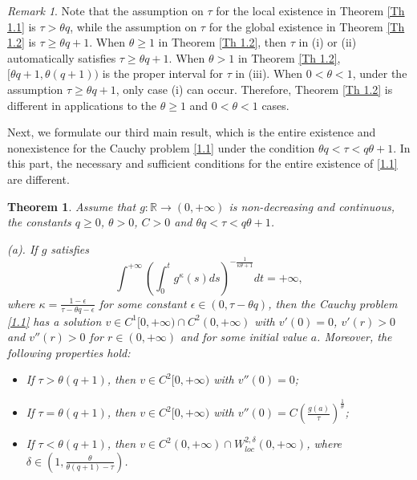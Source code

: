 \documentclass[a4paper,11pt]{amsart}
\theoremstyle{plain}
\newtheorem{Theorem}{Theorem}[section]
\theoremstyle{remark}
\newtheorem{remark}{Remark}
\numberwithin{equation}{section}
\numberwithin{figure}{section}
\numberwithin{remark}{section}
\begin{document}
\begin{sloppypar}
\begin{remark}\label{Remark 1.1}
Note that the assumption on $\tau$ for the local existence in Theorem \ref{Th 1.1} is $\tau > \theta q$, while the assumption on $\tau$ for the global existence in Theorem \ref{Th 1.2} is $\tau \ge \theta q+1$. When $\theta \ge 1$ in Theorem \ref{Th 1.2}, then $\tau$ in (i) or (ii) automatically satisfies $\tau \ge \theta q+1$. When $\theta > 1$ in Theorem \ref{Th 1.2}, $[\theta q+1, \theta (q+1))$ is the proper interval for $\tau$ in (iii). When $0<\theta<1$, under the assumption $\tau \ge \theta q+1$, only case (i) can occur. Therefore, Theorem \ref{Th 1.2}  is different in applications to the $\theta \ge 1$ and $0<\theta <1$ cases.
\end{remark}

Next, we formulate our third main result, which is the entire existence and nonexistence for the Cauchy problem \eqref{1.1} under the condition $\theta q< \tau < q\theta+1$. In this part, the necessary and  sufficient conditions for the entire existence of \eqref{1.1} are different.
\begin{Theorem}\label{Th 1.3}
Assume that $g: \mathbb{R} \to (0,+\infty)$ is  non-decreasing and continuous, the constants $q\ge 0$, $\theta> 0$, $C>0$ and $\theta q  < \tau <  q\theta+1$. 

(a). If $g$ satisfies
	\begin{equation}\label{1.3}
	\int^{+\infty} \left ( \int_0^t g^{\kappa}(s)ds \right )^{-\frac{1}{\kappa \theta+1}} dt = + \infty,
	\end{equation}
where $\kappa =\frac{1-\epsilon}{\tau -\theta q - \epsilon}$ for some constant $\epsilon\in (0, \tau-\theta q)$,
then the Cauchy problem \eqref{1.1} has a solution $v \in C^1[0, +\infty)\cap C^2(0, +\infty)$ with $v'(0)=0$, $v'(r)>0$ and $v''(r)>0$ for $r\in (0, +\infty)$ and for some initial value $a$. Moreover, the following properties hold:
\begin{itemize}
\item[(i).] If $\tau> \theta (q+1)$, then $v\in C^2[0, +\infty)$ with $v''(0)=0$; 

\item[(ii).] If $\tau= \theta (q+1)$, then $v\in C^2[0, +\infty)$ with $v''(0)=C(\frac{g(a)}{\tau})^{\frac{1}{\theta}}$; 

\item[(iii).] If $\tau < \theta (q+1)$, then $v \in C^2(0, +\infty) \cap W_{loc}^{2, \delta}(0, +\infty)$, where $\delta \in (1, \frac{\theta}{\theta (q+1)-\tau})$.
\end{itemize}


\end{Theorem}
\end{sloppypar}
\end{document}
